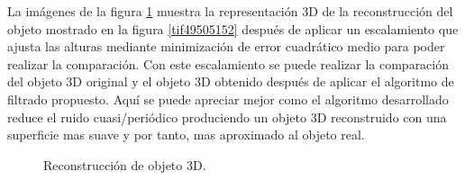 \documentclass[10pt,letterpaper]{article}
\begin{document}
La imágenes de la figura \ref{tif535455} muestra la representación 3D de la reconstrucción del objeto mostrado en la figura \ref{tif49505152} después de aplicar un escalamiento que ajusta las alturas mediante minimización de error cuadrático medio \cite{Alfa:Mont} para poder realizar la comparación. Con este escalamiento se puede realizar la comparación del objeto 3D original y el objeto 3D obtenido después de aplicar el algoritmo de filtrado propuesto. Aquí se puede apreciar mejor como el algoritmo desarrollado reduce el ruido cuasi/periódico produciendo un objeto 3D reconstruido con una superficie mas suave y por tanto, mas aproximado al objeto real. %

\begin{figure}[H]
      \begin{center}
        \caption{Reconstrucción de objeto 3D.}
        \label{tif535455}
      \end{center}
\end{figure}
    
\end{document}
